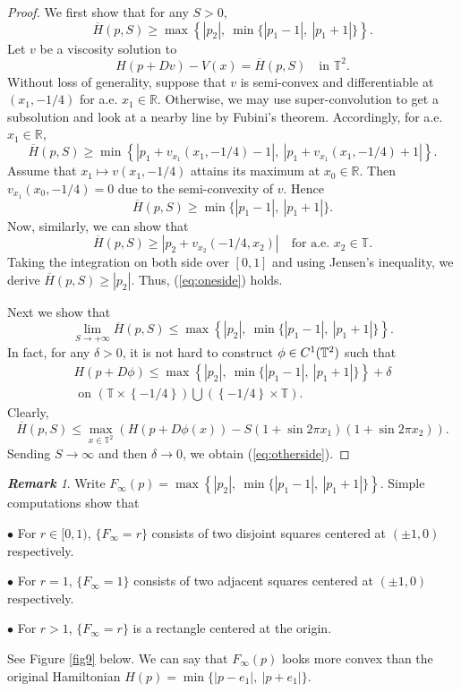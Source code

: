 \documentclass[12pt,reqno]{amsart}
\theoremstyle{plain}
\theoremstyle{remark}
\newtheorem{rem}{\bf{Remark}}
\numberwithin{equation}{section}
\newcommand{\R}{\mathbb{R}}
\newcommand{\T}{\mathbb{T}}
\begin{document}
\begin{proof}
We first show that for any $S>0$,  
\begin{equation}\label{eq:oneside}
\overline H(p,S)\geq \max\left\{|p_2|, \  \min \{|p_1-1|, \  |p_1+1|\}\right\}.
\end{equation}
Let $v$ be a viscosity solution to 
\[
H(p+Dv)-V(x)=\overline H(p,S)   \quad \text{in $\T ^2$}.
\]
Without loss of generality,  suppose that $v$ is semi-convex and  differentiable at $(x_1,  -1/4)$ for a.e.  $x_1\in  \R$.  
Otherwise,  we may use super-convolution to get a subsolution and look at a nearby line by Fubini's theorem.  Accordingly,  for a.e. $x_1\in  \R$,
\[
\overline H(p,S)  \geq \min \left\{|p_1+v_{x_1}(x_1,-1/4)-1|,  \  |p_1+v_{x_1}(x_1,-1/4)+1|\right\}.
\]
Assume that $x_1 \mapsto v(x_1,-1/4)$ attains its maximum at $x_0\in  \R$.  
Then $v_{x_1}(x_0,-1/4)=0$ due to the semi-convexity of $v$.  Hence 
\[
\overline H(p,S)\geq  \min \{|p_1-1|, \  |p_1+1|\}. 
\]
Now, similarly,  we can show that 
\[
\overline H(p,S)\geq |p_2+v_{x_2}( -1/4, x_2)|   \quad \text{for a.e. $x_2\in  \T$}.
\]
Taking the integration on both side over $[0,1]$
and using Jensen's inequality, we derive $\overline H(p,S)\geq |p_2|$.  
Thus,  (\ref{eq:oneside}) holds.



Next we show that 
\begin{equation}\label{eq:otherside}
\lim_{S\to +\infty}\overline H(p,S)\leq \max\left\{|p_2|, \  \min \{|p_1-1|, \  |p_1+1|\}\right\}.
\end{equation}
In fact, for any $\delta>0$,  it is not hard to construct $\phi\in C^1(\Bbb T^2)$ such that 
\begin{multline*}
H(p+D\phi)\leq \max\left\{|p_2|, \  \min \{|p_1-1|, \  |p_1+1|\}\right\}+\delta \\
 \text{ on $\left(\T \times \left\{-1/4\right\}\right) \bigcup \left(\left\{-1/4\right\}\times\T\right)$}.
\end{multline*}
Clearly,  
\[
\overline H(p,S)\leq \max_{x\in \T^2}  \left(H(p+D\phi(x))-S(1+\sin 2\pi x_1)(1+\sin 2\pi x_2)\right).
\]
Sending $S\to \infty$ and then $\delta\to 0$,  we obtain (\ref{eq:otherside}).

\end{proof}



\begin{rem}  Write $F_{\infty}(p)=\max\left\{|p_2|, \  \min \{|p_1-1|, \  |p_1+1|\}\right\}$.  Simple computations show that 

$\bullet$ For $r\in  [0, 1)$,   $\{F_{\infty}=r\}$ consists of two disjoint squares centered at $(\pm 1, 0)$ respectively.  

$\bullet$ For $r=1$,   $\{F_{\infty}=1\}$ consists of two adjacent squares centered at $(\pm 1, 0)$ respectively.

$\bullet$ For $r>1$,  $\{F_{\infty}=r\}$  is a rectangle centered at the origin.  

See Figure \ref{fig9} below.   
We can say that $F_{\infty}(p)$ looks more convex than the original Hamiltonian $H(p)=\min \{|p-e_1|, \  |p+e_1|\}$. 
\end{rem}
\end{document}
